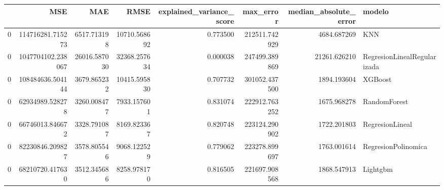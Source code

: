 \begin{tabular}{lrrrrrrl}
\toprule
 & MSE & MAE & RMSE & explained_variance_score & max_error & median_absolute_error & modelo \\
\midrule
0 & 114716281.715273 & 6517.713198 & 10710.568692 & 0.773500 & 212511.742929 & 4684.687269 & KNN \\
0 & 1047704102.238067 & 26016.587030 & 32368.257634 & 0.000038 & 247499.389869 & 21261.626210 & RegresionLinealRegularizada \\
0 & 108484636.504144 & 3679.865232 & 10415.595830 & 0.707732 & 301052.437500 & 1894.193604 & XGBoost \\
0 & 62934989.528278 & 3260.008477 & 7933.157601 & 0.831074 & 222912.763252 & 1675.968278 & RandomForest \\
0 & 66746013.846672 & 3328.791087 & 8169.823367 & 0.820748 & 223124.290902 & 1722.201803 & RegresionLineal \\
0 & 82230846.209827 & 3578.805546 & 9068.122529 & 0.779062 & 223278.899697 & 1763.001614 & RegresionPolinomica \\
0 & 68210720.417630 & 3512.345686 & 8258.978170 & 0.816505 & 221697.908568 & 1868.547913 & Lightgbm \\
\bottomrule
\end{tabular}
